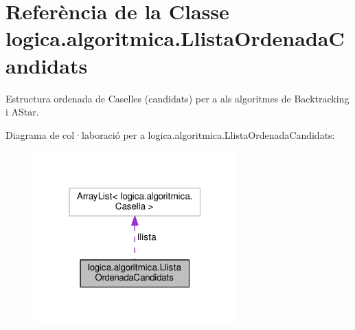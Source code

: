 \hypertarget{classlogica_1_1algoritmica_1_1_llista_ordenada_candidats}{\section{Referència de la Classe logica.\+algoritmica.\+Llista\+Ordenada\+Candidats}
\label{classlogica_1_1algoritmica_1_1_llista_ordenada_candidats}
}


Estructura ordenada de Caselles (candidats) per a als algoritmes de Backtracking i A\+Star.  




Diagrama de col·laboració per a logica.\+algoritmica.\+Llista\+Ordenada\+Candidats\+:
\nopagebreak
\begin{figure}[H]
\begin{center}
\leavevmode
\includegraphics[width=223pt]{classlogica_1_1algoritmica_1_1_llista_ordenada_candidats__coll__graph}
\end{center}
\end{figure}
